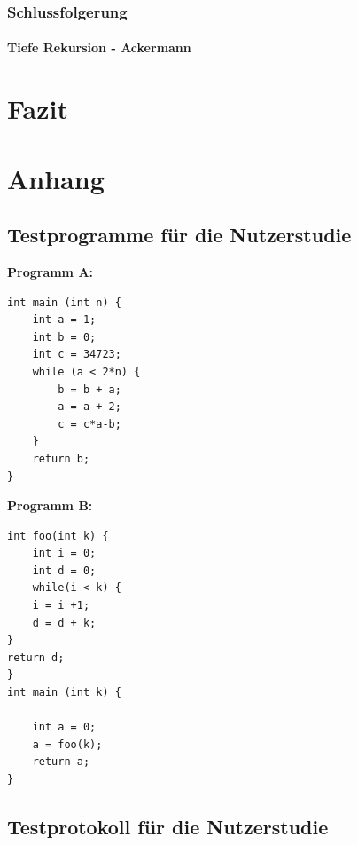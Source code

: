 \documentclass[parskip=full]{scrartcl}
\begin{document}
    \subsubsection{Schlussfolgerung}

\paragraph{Tiefe Rekursion - Ackermann}

\newpage
\section{Fazit}



\newpage

\printglossary[style=altlist, toctitle=Glossar]
\newpage

\section{Anhang}
\subsection{Testprogramme für die Nutzerstudie}\label{code}
\textbf{Programm A:}
\begin{verbatim}
int main (int n) {
	int a = 1;
	int b = 0;
	int c = 34723;
	while (a < 2*n) {
		b = b + a;
		a = a + 2;
		c = c*a-b;
	}
	return b;
}
\end{verbatim}

\textbf{Programm B:}
\begin{verbatim}
int foo(int k) {
	int i = 0;
	int d = 0;
	while(i < k) {
	i = i +1;
	d = d + k;
}
return d;
}
int main (int k) {

	int a = 0;
	a = foo(k);
	return a;
}
\end{verbatim}

\subsection{Testprotokoll für die Nutzerstudie}\label{usertest}


\end{document}

